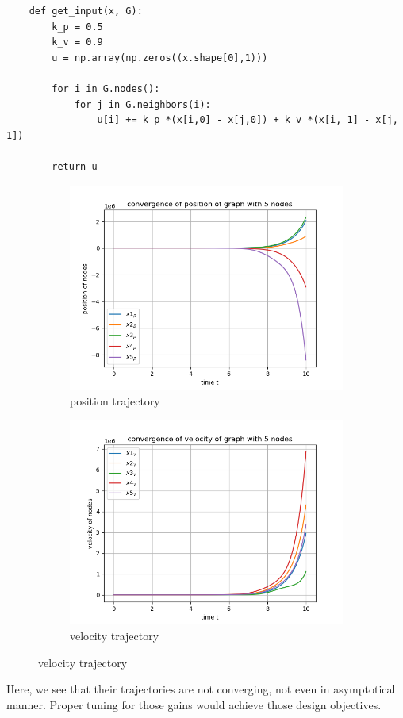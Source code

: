 \documentclass{article}
\begin{document}
\begin{problem}
    \begin{verbatim}
    def get_input(x, G):
        k_p = 0.5
        k_v = 0.9
        u = np.array(np.zeros((x.shape[0],1)))
        
        for i in G.nodes():
            for j in G.neighbors(i):
                u[i] += k_p *(x[i,0] - x[j,0]) + k_v *(x[i, 1] - x[j, 1])
    
        return u
    \end{verbatim}
    \begin{figure}[!h]
        \centering
        \begin{subfigure}{0.4\textwidth}
            \includegraphics[width=\textwidth]{./img/Figure_5_1.png}
            \caption{position trajectory}
        \end{subfigure}
        \begin{subfigure}{0.4\textwidth}
            \includegraphics[width=\textwidth]{./img/Figure_5_2.png}
            \caption{velocity trajectory}
        \end{subfigure}
        

    \end{figure}
    Here, we see that their trajectories are not converging, not even in asymptotical manner. Proper tuning for those gains would achieve those design objectives. 
\end{problem}
\end{document}
